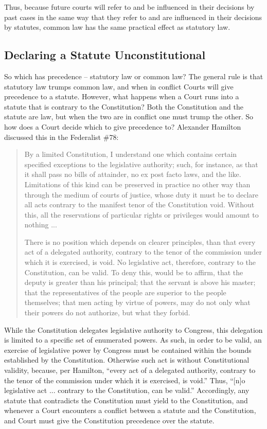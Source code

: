 Thus, because future courts will refer to and be influenced in their decisions by past cases in the same way that they refer to and are influenced in their decisions by statutes, common law has the same practical effect as statutory law.



\subsection{Declaring a Statute Unconstitutional}

So which has precedence -- statutory law or common law?  The general rule is that statutory law trumps common law, and when in conflict Courts will give precedence to a statute.
However, what happens when a Court runs into a statute that is contrary to the Constitution?  
Both the Constitution and the statute are law, but when the two are in conflict one must trump the other.
So how does a Court decide which to give precedence to?
Alexander Hamilton discussed this in the Federalist \#78:

\begin{quote}

By a limited Constitution, I understand one which contains certain specified exceptions to the legislative authority; 
such, for instance, as that it shall pass no bills of attainder, no ex post facto laws, and the like. 
Limitations of this kind can be preserved in practice no other way than through the medium of courts of justice, whose duty it must be to declare all acts contrary to the manifest tenor of the Constitution void. 
Without this, all the reservations of particular rights or privileges would amount to nothing ...

There is no position which depends on clearer principles, than that every act of a delegated authority, contrary to the tenor of the commission under which it is exercised, is void. 
No legislative act, therefore, contrary to the Constitution, can be valid. To deny this, would be to affirm, that the deputy is greater than his principal; that the servant is above his master; that the representatives of the people are superior to the people themselves; that men acting by virtue of powers, may do not only what their powers do not authorize, but what they forbid.

\end{quote}

While the Constitution delegates legislative authority to Congress, this delegation is limited to a specific set of enumerated powers.  As such, in order to be valid, an exercise of legislative power by Congress must be contained within the bounds established by the Constitution.  Otherwise such act is without Constitutional validity, because, per Hamilton, ``every act of a delegated authority, contrary to the tenor of the commission under which it is exercised, is void.''  Thus, ``[n]o legislative act ... contrary to the Constitution, can be valid.''  Accordingly, any statute that contradicts the Constitution must yield to the Constitution, and whenever a Court encounters a conflict between a statute and the Constitution, and Court must give the Constitution precedence over the statute.


